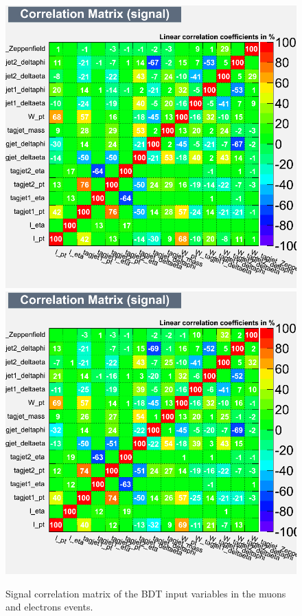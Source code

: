 \begin{figure}[ht]
\centerline{
\includegraphics[width=.49\textwidth]{figs/bdtoutput/EWKW2jets_mu_0to100_BDT_traning2_lite_mjj_300root_CorrelationMatrixS.png}
\includegraphics[width=.49\textwidth]{figs/bdtoutput/EWKW2jets_el_0to100_BDT_traning2_lite_mjj_300root_CorrelationMatrixS.png}
}
\caption{Signal correlation matrix of the BDT input variables in the muons and electrons events.}
\label{fig:correlation_matrix}
\end{figure}

